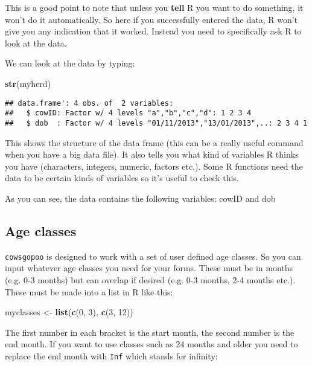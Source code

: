 \documentclass[12pt]{article}
\newcommand{\KeywordTok}[1]{\textcolor[rgb]{0.13,0.29,0.53}{\textbf{{#1}}}}
\newcommand{\DecValTok}[1]{\textcolor[rgb]{0.00,0.00,0.81}{{#1}}}
\newcommand{\StringTok}[1]{\textcolor[rgb]{0.31,0.60,0.02}{{#1}}}
\newcommand{\NormalTok}[1]{{#1}}
\begin{document}
This is a good point to note that unless you \textbf{tell} R you want to
do something, it won't do it automatically. So here if you successfully
entered the data, R won't give you any indication that it worked.
Instead you need to specifically ask R to look at the data.

We can look at the data by typing:

\begin{snugshade}
\begin{Highlighting}[]
\KeywordTok{str}\NormalTok{(myherd)}
\end{Highlighting}
\end{snugshade}

\begin{verbatim}
## data.frame': 4 obs. of  2 variables:
##   $ cowID: Factor w/ 4 levels "a","b","c","d": 1 2 3 4
##   $ dob  : Factor w/ 4 levels "01/11/2013","13/01/2013",..: 2 3 4 1
\end{verbatim}

This shows the structure of the data frame (this can be a really useful
command when you have a big data file). It also tells you what kind of
variables R thinks you have (characters, integers, numeric, factors
etc.). Some R functions need the data to be certain kinds of variables
so it's useful to check this.

As you can see, the data contains the following variables: cowID and dob 

\subsection{Age classes}

\texttt{cowsgopoo} is designed to work with a set of user defined age classes. So you can input whatever age classes you need for your forms. These must be in months (e.g. 0-3 months) but can overlap if desired (e.g. 0-3 months, 2-4 months etc.). These must be made into a list in R like this:

\begin{snugshade}
\begin{Highlighting}[]
\NormalTok{myclasses <-}\StringTok{ }\KeywordTok{list}\NormalTok{(}\KeywordTok{c}\NormalTok{(}\DecValTok{0}\NormalTok{,} \DecValTok{3}\NormalTok{),} \KeywordTok{c}\NormalTok{(}\DecValTok{3}\NormalTok{,} \DecValTok{12}\NormalTok{))}
\end{Highlighting}
\end{snugshade}

The first number in each bracket is the start month, the second number is the end month. If you want to use classes such as 24 months and older you need to replace the end month with \texttt{Inf} which stands for infinity:
\end{document}
